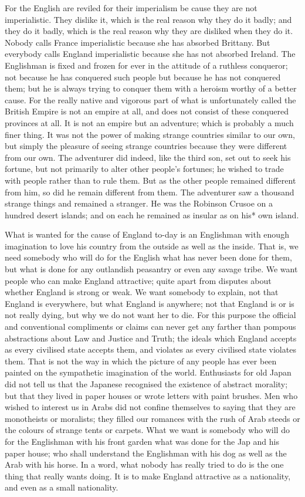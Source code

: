 \documentclass{book}
\begin{document}
For the English are reviled for their imperialism be cause they are not imperialistic. They dislike it, which is the real reason why they do it badly; and they do it badly, which is the real reason why they are disliked when they do it. Nobody calls France imperialistic because she has absorbed Brittany. But everybody calls England imperialistic because she has not absorbed Ireland. The Englishman is fixed and frozen for ever in the attitude of a ruthless conqueror; not because he has conquered such people but because he has not conquered them; but he is always trying to conquer them with a heroism worthy of a better cause. For the really native and vigorous part of what is unfortunately called the British Empire is not an empire at all, and does not consist of these conquered provinces at all. It is not an empire but an adventure; which is probably a much finer thing. It was not the power of making strange countries similar to our own, but simply the pleasure of seeing strange countries because they were different from our own. The adventurer did indeed, like the third son, set out to seek his fortune, but not primarily to alter other people’s fortunes; he wished to trade with people rather than to rule them. But as the other people remained different from him, so did he remain different from them. The adventurer saw a thousand strange things and remained a stranger. He was the Robinson Crusoe on a hundred desert islands; and on each he remained as insular as on his* own island.

What is wanted for the cause of England to-day is an Englishman with enough imagination to love his country from the outside as well as the inside. That is, we need somebody who will do for the English what has never been done for them, but what is done for any outlandish peasantry or even any savage tribe. We want people who can make England attractive; quite apart from disputes about whether England is strong or weak. We want somebody to explain, not that England is everywhere, but what England is anywhere; not that England is or is not really dying, but why we do not want her to die. For this purpose the official and conventional compliments or claims can never get any farther than pompous abstractions about Law and Justice and Truth; the ideals which England accepts as every civilised state accepts them, and violates as every civilised state violates them. That is not the way in which the picture of any people has ever been painted on the sympathetic imagination of the world. Enthusiasts for old Japan did not tell us that the Japanese recognised the existence of abstract morality; but that they lived in paper houses or wrote letters with paint brushes. Men who wished to interest us in Arabs did not confine themselves to saying that they are monotheists or moralists; they filled our romances with the rush of Arab steeds or the colours of strange tents or carpets. What we want is somebody who will do for the Englishman with his front garden what was done for the Jap and his paper house; who shall understand the Englishman with his dog as well as the Arab with his horse. In a word, what nobody has really tried to do is the one thing that really wants doing. It is to make England attractive as a nationality, and even as a small nationality.
\end{document}
